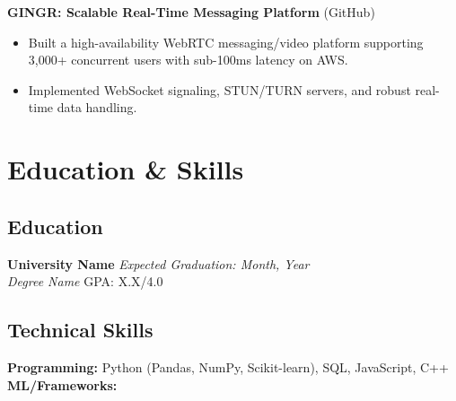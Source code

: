 \documentclass[10pt, letterpaper]{article}
\begin{document}
\textbf{GINGR: Scalable Real-Time Messaging Platform} (GitHub)
\begin{itemize}[leftmargin=*, itemsep=2pt]
    \item Built a high-availability WebRTC messaging/video platform supporting 3,000+ concurrent users with sub-100ms latency on AWS.
    \item Implemented WebSocket signaling, STUN/TURN servers, and robust real-time data handling.
\end{itemize}

\section{Education & Skills}
\subsection*{Education}
\textbf{University Name} \hfill \textit{Expected Graduation: Month, Year} \\
\textit{Degree Name} \hfill GPA: X.X/4.0
\vspace{2mm}

\subsection*{Technical Skills}
\textbf{Programming:} Python (Pandas, NumPy, Scikit-learn), SQL, JavaScript, C++ \\
\textbf{ML/Frameworks:}
\end{document}
